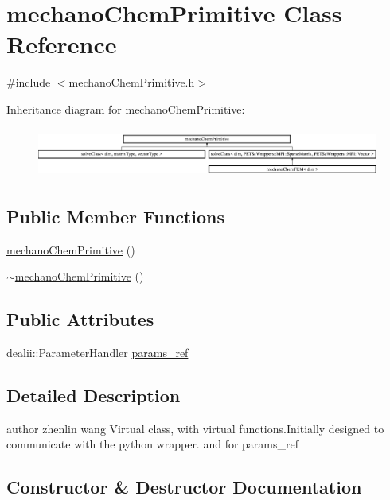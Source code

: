 \section{mechano\-Chem\-Primitive Class Reference}
\label{classmechano_chem_primitive}


{\ttfamily \#include $<$mechano\-Chem\-Primitive.\-h$>$}

Inheritance diagram for mechano\-Chem\-Primitive\-:\begin{figure}[H]
\begin{center}
\leavevmode
\includegraphics[height=1.650295cm]{classmechano_chem_primitive}
\end{center}
\end{figure}
\subsection*{Public Member Functions}
\begin{DoxyCompactItemize}
\item 
\hyperlink{classmechano_chem_primitive_a3c34d5e567d1187c409a4337289760ee}{mechano\-Chem\-Primitive} ()
\item 
\hyperlink{classmechano_chem_primitive_a75af109e7881383b100372d5c9121ee9}{$\sim$mechano\-Chem\-Primitive} ()
\end{DoxyCompactItemize}
\subsection*{Public Attributes}
\begin{DoxyCompactItemize}
\item 
dealii\-::\-Parameter\-Handler \hyperlink{classmechano_chem_primitive_a346c15877bf81bdb4fd274d71a73d7da}{params\-\_\-ref}
\end{DoxyCompactItemize}


\subsection{Detailed Description}
author zhenlin wang Virtual class, with virtual functions.\-Initially designed to communicate with the python wrapper. and for params\-\_\-ref 

\subsection{Constructor \& Destructor Documentation}
